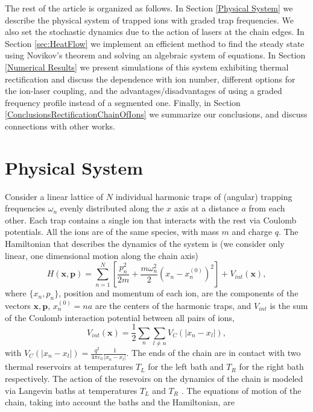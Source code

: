 The rest of the article is organized as follows. In Section \ref{Physical System} we describe the physical system of trapped ions with graded trap frequencies. We also set the stochastic dynamics due to the action of lasers at the chain edges.
In Section \ref{sec:HeatFlow}  we implement an efficient  method to find the steady state using Novikov's theorem and solving an algebraic system of equations. In Section \ref{Numerical Results} we present simulations of this system exhibiting thermal rectification and discuss the dependence with ion number, different options for the ion-laser coupling, and the advantages/disadvantages of using a graded frequency profile instead of a segmented one. Finally, in Section \ref{ConclusionsRectificationChainOfIons} we summarize our conclusions, and discuss connections with other works.
%
%
%
\section{Physical System\label{Physical System}}
%
%
%
%
Consider a linear lattice of $N$ individual harmonic traps of (angular) trapping frequencies  $\omega_n$ evenly distributed along the $x$ axis at a distance $a$ from each other. Each trap contains a single ion that interacts with the rest via Coulomb potentials. All the ions are of the same species, with mass $m$ and charge $q$. The Hamiltonian that describes the dynamics of the system is (we consider only linear, one dimensional motion along the chain axis)
%
\begin{equation}
    H(\bm{x},\bm{p}) = \sum_{n=1}^N \left[\frac{p_n^2}{2m}  + \frac{m\omega_n^2}{2} (x_n - x_n^{(0)})^2\right] + V_{int}(\bm{x}),
    \label{eq:ChainHamiltonian}
\end{equation}
%
where $\{x_n,p_n\}$, position and momentum of each ion, are the components of  the vectors
$\bm{x},\bm{p}$, $x_n^{(0)} = n  a$ are the centers of the harmonic traps, and $V_{int}$ is the sum of the Coulomb interaction potential between all  pairs of ions,
%
\begin{equation}
    V_{int}(\bm{x}) = \frac{1}{2}\sum_n \sum_{l\neq n} V_{C}(\left|x_n-x_l\right|),
    \label{eq:InteractionHamiltonian}
\end{equation}
%
with $V_{C}(\left|x_n-x_l\right|) = \frac{q^2}{4\pi\varepsilon_0}\frac{1}{\left|x_n-x_l\right|}$. The ends of the chain are in contact with two thermal reservoirs at temperatures $T_L$ for the left bath and $T_R$ for the right bath respectively. The action of the resevoirs on the dynamics of the chain is modeled via Langevin baths at temperatures $T_L$ and $T_R$ \cite{Lepri2003,Dhar2018}. The equations of motion of the chain, taking into account the baths and the Hamiltonian, are

